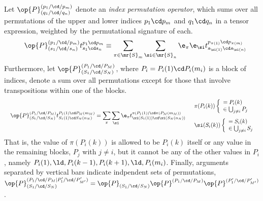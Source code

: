 \documentclass[11pt,fleqn]{article}
\numberwithin{equation}{section}
\begin{document}
\begin{dfn}
Let $\op{P}^{(p_1/\cd/p_m)}_{(q_1/\cd/q_n)}$ denote an \textit{index permutation operator}, which sums over all permutations of the upper and lower indices $p_1\cd p_m$ and $q_1\cd q_n$ in a tensor expression, weighted by the permutational signature of each.
\begin{align}
&&
  \op{P}^{(p_1/\cd/p_m)}_{(s_1/\cd/s_n)}
  t^{p_1\cd p_m}_{s_1\cd s_n}
\equiv
  \sum_{\pi\in\mr{S}_m}
  \sum_{\si\in\mr{S}_n}
  \e_\pi\e_\si
  t^{p_{\pi(1)}\cd p_{\pi(m)}}_{s_{\si(1)}\cd s_{\si(n)}}
\end{align}
Furthermore, let $\op{P}^{(P_1/\cd/P_M)}_{(S_1/\cd/S_N)}$, where $P_i=P_i(1)\cd P_i(m_i)$ is a block of indices, denote a sum over all permutations except for those that involve transpositions within one of the blocks.
\begin{align}
&&
  \op{P}^{(P_1/\cd/P_M)}_{(S_1/\cd/S_N)}
  t^{P_1(1)\cd P_M(m_M)}_{S_1(1)\cd S_N(n_N)}
=
  \sum_\pi
  \sum_\si
  \e_\pi
  t^{\pi(P_1(1))\cd\pi(P_M(m_M))}_{\si(S_1(1))\cd\si(S_N(n_N))}
&&
  \begin{array}{l}
    \pi(P_i(k))
    \left\{\begin{array}{l}
      = P_i(k) \\
      \in \bigcup_{j\neq i} P_j
    \end{array}\right.
  \\[15pt]
    \si(S_i(k))
    \left\{\begin{array}{l}
      = S_i(k) \\
      \in \bigcup_{j\neq i} S_j
    \end{array}\right.
  \end{array}
\end{align}
That is, the value of $\pi(P_i(k))$ is allowed to be $P_i(k)$ itself or any value in the remaining blocks, $P_j$ with $j\neq i$, but it cannot be any of the other values in $P_i$, namely $P_i(1),\ld, P_i(k-1), P_i(k+1),\ld, P_i(m_i)$.
Finally, arguments separated by vertical bars indicate indpendent sets of permutations, 
$
  \op{P}^{(P_1/\cd/P_M|P'_1/\cd/P'_{M'})}_{(S_1/\cd/S_N)}
=
  \op{P}_{(S_1/\cd/S_N)}
  \op{P}^{(P_1/\cd/P_M)}
  \op{P}^{(P'_1/\cd/P'_{M'})}
$.
\end{dfn}
\end{document}
